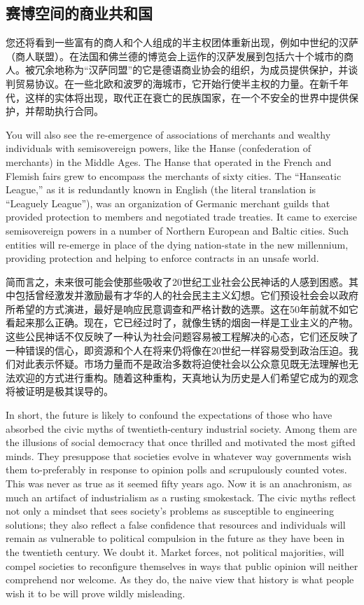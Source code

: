\subsection{赛博空间的商业共和国}
\begin{paracol}{2}
您还将看到一些富有的商人和个人组成的半主权团体重新出现，例如中世纪的汉萨（商人联盟）。在法国和佛兰德的博览会上运作的汉萨发展到包括六十个城市的商人。被冗余地称为“汉萨同盟”的它是德语商业协会的组织，为成员提供保护，并谈判贸易协议。在一些北欧和波罗的海城市，它开始行使半主权的力量。在新千年代，这样的实体将出现，取代正在衰亡的民族国家，在一个不安全的世界中提供保护，并帮助执行合同。

\switchcolumn
You will also see the re-emergence of associations of merchants and wealthy individuals with semisovereign powers, like the Hanse (confederation of merchants) in the Middle Ages. The Hanse that operated in the French and Flemish fairs grew to encompass the merchants of sixty cities. The ``Hanseatic League,'' as it is redundantly known in English (the literal translation is ``Leaguely League''), was an organization of Germanic merchant guilds that provided protection to members and negotiated trade treaties. It came to exercise semisovereign powers in a number of Northern European and Baltic cities. Such entities will re-emerge in place of the dying nation-state in the new millennium, providing protection and helping to enforce contracts in an unsafe world.

\switchcolumn*
简而言之，未来很可能会使那些吸收了20世纪工业社会公民神话的人感到困惑。其中包括曾经激发并激励最有才华的人的社会民主主义幻想。它们预设社会会以政府所希望的方式演进，最好是响应民意调查和严格计数的选票。这在50年前就不如它看起来那么正确。现在，它已经过时了，就像生锈的烟囱一样是工业主义的产物。这些公民神话不仅反映了一种认为社会问题容易被工程解决的心态，它们还反映了一种错误的信心，即资源和个人在将来仍将像在20世纪一样容易受到政治压迫。我们对此表示怀疑。市场力量而不是政治多数将迫使社会以公众意见既无法理解也无法欢迎的方式进行重构。随着这种重构，天真地认为历史是人们希望它成为的观念将被证明是极其误导的。

\switchcolumn
In short, the future is likely to confound the expectations of those who have absorbed the civic myths of twentieth-century industrial society. Among them are the illusions of social democracy that once thrilled and motivated the most gifted minds. They presuppose that societies evolve in whatever way governments wish them to-preferably in response to opinion polls and scrupulously counted votes. This was never as true as it seemed fifty years ago. Now it is an anachronism, as much an artifact of industrialism as a rusting smokestack. The civic myths reflect not only a mindset that sees society's problems as susceptible to engineering solutions; they also reflect a false confidence that resources and individuals will remain as vulnerable to political compulsion in the future as they have been in the twentieth century. We doubt it. Market forces, not political majorities, will compel societies to reconfigure themselves in ways that public opinion will neither comprehend nor welcome. As they do, the naive view that history is what people wish it to be will prove wildly misleading. 


\end{paracol}

